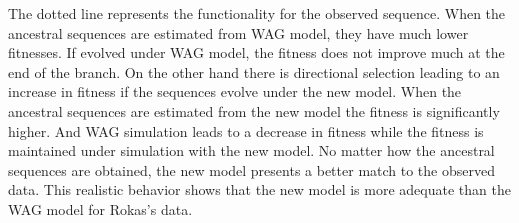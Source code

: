 \documentclass[13pt]{article}
\begin{document}
The dotted line represents the functionality for the observed sequence.
When the ancestral sequences are estimated from WAG model, they have much lower fitnesses. 
If evolved under WAG model, the fitness does not improve much at the end of the branch.
On the other hand there is directional selection leading to an increase in fitness if the sequences evolve under the new model. 
When the ancestral sequences are estimated from the new model the fitness is significantly higher. 
And WAG simulation leads to a decrease in fitness while the fitness is maintained under simulation with the new model.
No matter how the ancestral sequences are obtained, the new model presents a better match to the observed data.
This realistic behavior shows that the new model is more adequate than the WAG model for Rokas's data.
\end{document}
